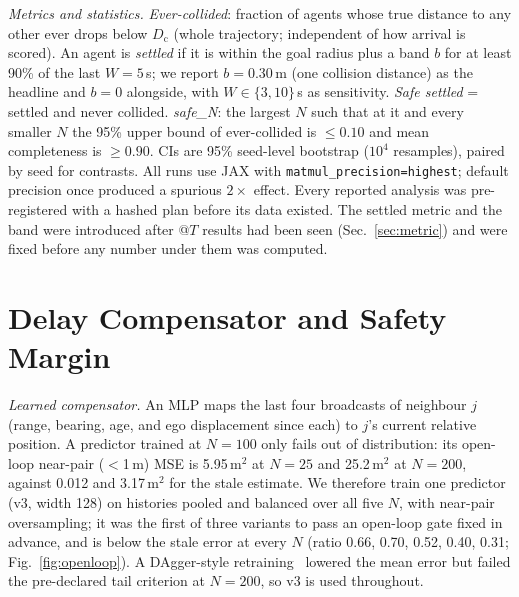 \documentclass[letterpaper,10pt,journal,twoside]{IEEEtran}
\begin{document}
\emph{Metrics and statistics.} \emph{Ever-collided}: fraction of agents whose true distance to any other ever
drops below $D_{\mathrm{c}}$ (whole trajectory; independent of how arrival is scored). An agent is
\emph{settled} if it is within the goal radius plus a band $b$ for at least 90\% of the last $W{=}5$\,s; we report
$b{=}0.30$\,m (one collision distance) as the headline and $b{=}0$ alongside, with $W\in\{3,10\}$\,s as
sensitivity. \emph{Safe settled} = settled and never collided. \emph{safe\_N}: the largest $N$ such that at it and
every smaller $N$ the 95\% upper bound of ever-collided is $\le 0.10$ and mean completeness is $\ge 0.90$. CIs are
95\% seed-level bootstrap ($10^4$ resamples), paired by seed for contrasts. All runs use JAX with
\texttt{matmul\_precision=highest}; default precision once produced a spurious $2\times$ effect. Every
reported analysis was pre-registered with a hashed plan before its data existed. The settled metric and the band
were introduced after @$T$ results had been seen (Sec.~\ref{sec:metric}) and were fixed before any number under
them was computed.

\section{Delay Compensator and Safety Margin}
\label{sec:method}
\emph{Learned compensator.} An MLP maps the last four broadcasts of neighbour $j$ (range, bearing, age, and ego
displacement since each) to $j$'s current relative position. A predictor trained at $N{=}100$ only fails out of
distribution: its open-loop near-pair ($<$1\,m) MSE is 5.95\,m$^2$ at $N{=}25$ and 25.2\,m$^2$ at $N{=}200$,
against 0.012 and 3.17\,m$^2$ for the stale estimate. We therefore train one predictor (v3, width 128) on
histories pooled and balanced over all five $N$, with near-pair oversampling; it was the first of three
variants to pass an open-loop gate fixed in advance, and is below the stale error at every $N$ (ratio
0.66, 0.70, 0.52, 0.40, 0.31; Fig.~\ref{fig:openloop}). A DAgger-style retraining~\cite{ross2011reduction} lowered the mean error but
failed the pre-declared tail criterion at $N{=}200$, so v3 is used throughout.
\end{document}
